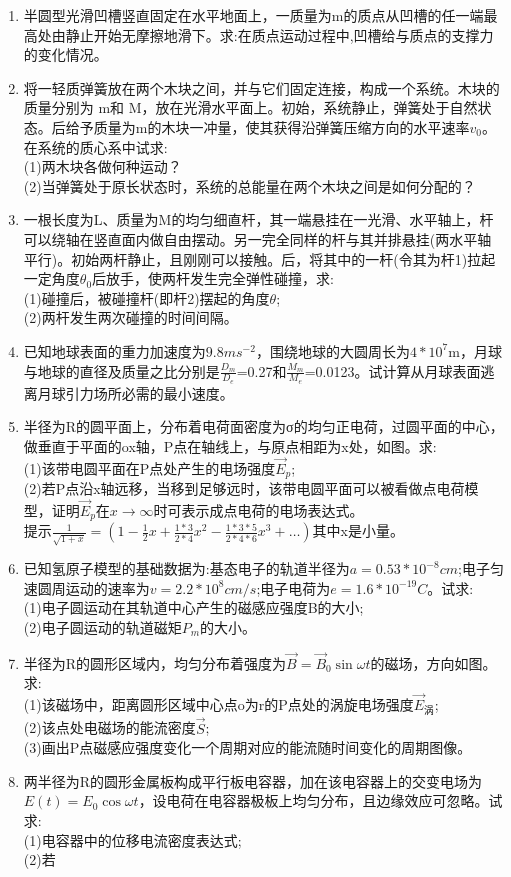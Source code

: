 \begin{enumerate}
\item 半圆型光滑凹槽竖直固定在水平地面上，一质量为m的质点从凹槽的任一端最高处由静止开始无摩擦地滑下。求:在质点运动过程中,凹槽给与质点的支撑力的变化情况。
\item 将一轻质弹簧放在两个木块之间，并与它们固定连接，构成一个系统。木块的质量分别为 m和 M，放在光滑水平面上。初始，系统静止，弹簧处于自然状态。后给予质量为m的木块一冲量，使其获得沿弹簧压缩方向的水平速率$v_0$。在系统的质心系中试求:\\
(1)两木块各做何种运动？\\
(2)当弹簧处于原长状态时，系统的总能量在两个木块之间是如何分配的？
\item 一根长度为L、质量为M的均匀细直杆，其一端悬挂在一光滑、水平轴上，杆可以绕轴在竖直面内做自由摆动。另一完全同样的杆与其并排悬挂(两水平轴平行)。初始两杆静止，且刚刚可以接触。后，将其中的一杆(令其为杆1)拉起一定角度$\theta_0$后放手，使两杆发生完全弹性碰撞，求:\\
(1)碰撞后，被碰撞杆(即杆2)摆起的角度$\theta$;\\
(2)两杆发生两次碰撞的时间间隔。
\item 已知地球表面的重力加速度为$9.8ms^{-2}$，围绕地球的大圆周长为$4*10^7$m，月球与地球的直径及质量之比分别是$\frac{D_m}{D_e}$=0.27和$\frac{M_m}{M_e}$=0.0123。试计算从月球表面逃离月球引力场所必需的最小速度。
\item 半径为R的圆平面上，分布着电荷面密度为σ的均匀正电荷，过圆平面的中心，做垂直于平面的ox轴，P点在轴线上，与原点相距为x处，如图。求:\\
(1)该带电圆平面在P点处产生的电场强度$\vec E_p$;\\
(2)若P点沿x轴远移，当移到足够远时，该带电圆平面可以被看做点电荷模型，证明$\vec E_p$在$x \to \infty$时可表示成点电荷的电场表达式。\\
提示$\displaystyle \frac{1}{\sqrt{1+x}}=(1-\frac{1}{2}x+\frac{1*3}{2*4}x^2-\frac{1*3*5}{2*4*6}x^3+\dots)$其中x是小量。
\item 已知氢原子模型的基础数据为:基态电子的轨道半径为$a=0.53*10^{-8}cm$;电子匀速圆周运动的速率为$v=2.2*10^8cm/s$;电子电荷为$e=1.6*10^{-19}C$。试求:\\
(1)电子圆运动在其轨道中心产生的磁感应强度B的大小;\\
(2)电子圆运动的轨道磁矩$P_m$的大小。
\item 半径为R的圆形区域内，均匀分布着强度为$\vec B=\vec B_0 \sin \omega t$的磁场，方向如图。求:\\
(1)该磁场中，距离圆形区域中心点o为r的P点处的涡旋电场强度$\vec E_\text{涡}$;\\
(2)该点处电磁场的能流密度$\vec S$;\\
(3)画出P点磁感应强度变化一个周期对应的能流随时间变化的周期图像。
\item 两半径为R的圆形金属板构成平行板电容器，加在该电容器上的交变电场为$E(t)=E_0 \cos \omega t$，设电荷在电容器极板上均匀分布，且边缘效应可忽略。试求:\\
(1)电容器中的位移电流密度表达式;\\
(2)若 $$
\end{enumerate}
